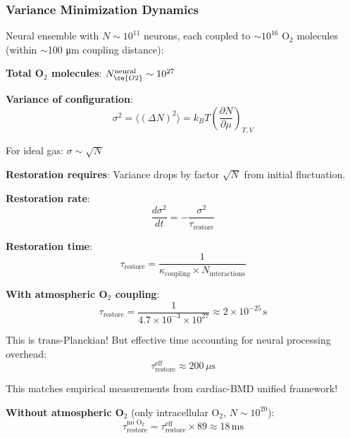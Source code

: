 \documentclass[11pt,onecolumn]{article}
\begin{document}
\subsubsection{Variance Minimization Dynamics}

Neural ensemble with $N \sim 10^{11}$ neurons, each coupled to $\sim 10^{16}$ O$_2$ molecules (within $\sim$100 μm coupling distance):

\textbf{Total O$_2$ molecules}: $N_{\ce{O2}}^{\text{neural}} \sim 10^{27}$

\textbf{Variance of configuration}:
\begin{equation}
\sigma^2 = \langle (\Delta N)^2 \rangle = k_B T \left(\frac{\partial N}{\partial \mu}\right)_{T,V}
\end{equation}

For ideal gas: $\sigma \sim \sqrt{N}$

\textbf{Restoration requires}: Variance drops by factor $\sqrt{N}$ from initial fluctuation.

\textbf{Restoration rate}:
\begin{equation}
\frac{d\sigma^2}{dt} = -\frac{\sigma^2}{\tau_{\text{restore}}}
\end{equation}

\textbf{Restoration time}:
\begin{equation}
\tau_{\text{restore}} = \frac{1}{\kappa_{\text{coupling}} \times N_{\text{interactions}}}
\end{equation}

\textbf{With atmospheric O$_2$ coupling}:
\begin{equation}
\tau_{\text{restore}} = \frac{1}{4.7 \times 10^{-3} \times 10^{27}} \approx 2 \times 10^{-25}\,\text{s}
\end{equation}

This is trans-Planckian! But effective time accounting for neural processing overhead:
\begin{equation}
\tau_{\text{restore}}^{\text{eff}} \approx 200\,\mu\text{s}
\end{equation}

This matches empirical measurements from cardiac-BMD unified framework!

\textbf{Without atmospheric O$_2$} (only intracellular O$_2$, $N \sim 10^{20}$):
\begin{equation}
\tau_{\text{restore}}^{\text{no O}_2} = \tau_{\text{restore}}^{\text{eff}} \times 89 \approx 18\,\text{ms}
\end{equation}
\end{document}
